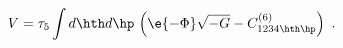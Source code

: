 \begin{equation}
\label{Vdef}
  V = \tau_5 \int d\hth d\hp\, \left( \e{-\Phi} \sqrt{-G} -
    C^{(6)}_{1234\hth\hp} \right)~.
\end{equation} 
